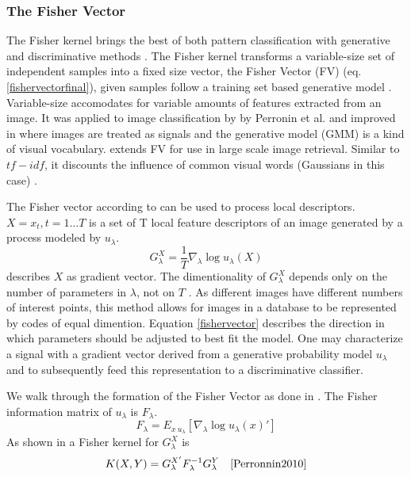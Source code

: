 \documentclass[english,12pt,a4paper,pdftex,elec,utf8]{aaltothesis}
\begin{document}
\subsubsection{The Fisher Vector}\label{FV}
The Fisher kernel brings the best of both pattern classification with generative and discriminative methods \cite{Jaakkola1999}. The Fisher kernel transforms a variable-size set of independent samples into a fixed size vector, the Fisher Vector (FV) (eq. \ref{fishervectorfinal}), given samples follow a training set based generative model \cite{Jaakkola1999}. Variable-size accomodates for variable amounts of features extracted from an image. It was applied to image classification by by Perronin et al. \cite{Perronnin2007} and improved in \cite{Perronnin2010} where images are treated as signals and the generative model (GMM) is a kind of visual vocabulary. \cite{Perronnin2010a} extends FV for use in large scale image retrieval. Similar to $tf-idf$, it discounts the influence of common visual words (Gaussians in this case) \cite{Perronnin2010a}.

The Fisher vector according to \cite{Perronnin2010} can be used to process local descriptors. $X = {x_t, t = 1 \ldots T}$ is a set of T local feature descriptors of an image generated by a process modeled by $u_\lambda$.
\begin{equation}\label{fishervector}
 G_\lambda^X = \frac{1}{T}\nabla_\lambda\log u_\lambda(X)
\end{equation}
describes $X$ as gradient vector. The dimentionality of $G_\lambda^X$ depends only on the number of parameters in $\lambda$, not on $T$ \cite{Perronnin2010}. As different images have different numbers of interest points, this method allows for images in a database to be represented by codes of equal dimention. Equation \ref{fishervector} describes the direction in which parameters should be adjusted to best fit the model. One may characterize a signal with a gradient vector derived from a generative probability model $u_\lambda$ and to subsequently feed this representation to a discriminative classifier. \cite{Perronnin2007}

We walk through the formation of the Fisher Vector as done in \cite{Perronnin2010}. The Fisher information matrix of $u_\lambda$ is $F_\lambda$.
\begin{equation}\label{fishermatrix}
F_\lambda = E_{x~u_\lambda}[\nabla_\lambda\log u_\lambda(x)']
\end{equation}
As shown in \cite{Jaakkola1999} a Fisher kernel for $G_\lambda^X$ is
\begin{equation}\label{fisherkernel}
K(X,Y) = G_\lambda^{X'}F_\lambda^{-1}G_\lambda^Y \quad \cite{Perronnin2010}
\end{equation}
\end{document}
